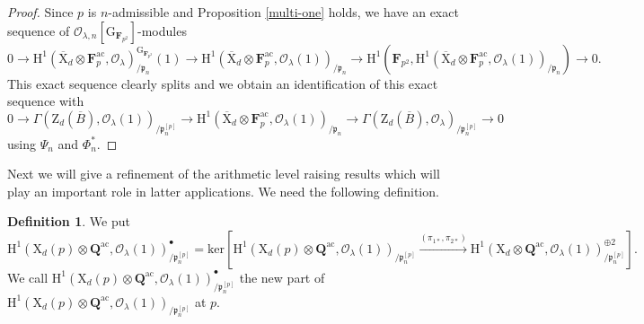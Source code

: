 \documentclass[10pt]{amsart}
\numberwithin{equation}{section}
\theoremstyle{plain}
\numberwithin{equation}{section}
\theoremstyle{definition}
\newtheorem{definition}[theorem]{Definition}
\theoremstyle{remark}
\def\ac{\mathrm{ac}}
\def\Qbar{\QQ^{\ac}}
\def\ac{\mathrm{ac}}
\def\calO{\mathcal{O}}
\def\frakp{\mathfrak{p}}
\def\FF{\mathbf{F}}
\def\QQ{\mathbf{Q}}
\def\rmG{\mathrm{G}}
\def\rmH{\mathrm{H}}
\def\rmX{\mathrm{X}}
\def\rmZ{\mathrm{Z}}
\begin{document}
\begin{proof}
Since $p$ is $n$-admissible and Proposition \ref{multi-one} holds, we have an exact sequence of $\calO_{\lambda, n}[\rmG_{\FF_{p^{2}}}]$-modules
\begin{equation*}
0\rightarrow \rmH^{1}(\overline{\rmX}_{d}\otimes{\FF^{\ac}_{p}}, \calO_{\lambda})_{/\frakp_{n}}^{\rmG_{\FF_{p^{2}}}}(1)\rightarrow \rmH^{1}(\overline{\rmX}_{d}\otimes{\FF^{\ac}_{p}}, \calO_{\lambda}(1))_{/\frakp_{n}}\rightarrow \rmH^{1}(\FF_{p^{2}}, \rmH^{1}(\overline{\rmX}_{d}\otimes{\FF^{\ac}_{p}}, \calO_{\lambda}(1))_{/\frakp_{n}})\rightarrow 0.
\end{equation*}
This exact sequence clearly splits and we obtain an identification of this exact sequence with 
\begin{equation*}
0\rightarrow\Gamma(\rmZ_{d}(\overline{B}), \calO_{\lambda}(1))_{/\frakp^{[p]}_{n}}\rightarrow\rmH^{1}(\overline{\rmX}_{d}\otimes{\FF^{\ac}_{p}}, \calO_{\lambda}(1))_{/\frakp_{n}}\rightarrow \Gamma(\rmZ_{d}(\overline{B}), \calO_{\lambda})_{/\frakp^{[p]}_{n}}\rightarrow0
\end{equation*}
using $\Psi_{n}$ and $\Phi^{\ast}_{n}$. 
\end{proof}

Next we will give a refinement of the arithmetic level raising results which will play an important role in latter applications. We need the following definition.
\begin{definition}
We put
\begin{equation*}
\rmH^{1}(\rmX_{d}(p)\otimes{\Qbar}, \calO_{\lambda}(1))^{\bullet}_{/\frakp^{[p]}_{n}}=\mathrm{ker}[\rmH^{1}(\rmX_{d}(p)\otimes{\Qbar}, \calO_{\lambda}(1))_{/\frakp^{[p]}_{n}}\xrightarrow{(\pi_{1\ast}, \pi_{2\ast})}\rmH^{1}(\rmX_{d}\otimes{\Qbar}, \calO_{\lambda}(1))_{/\frakp^{[p]}_{n}}^{\oplus2}].
\end{equation*}
We call  $\rmH^{1}(\rmX_{d}(p)\otimes{\Qbar}, \calO_{\lambda}(1))^{\bullet}_{/\frakp^{[p]}_{n}}$ the {new part} of $\rmH^{1}(\rmX_{d}(p)\otimes{\Qbar}, \calO_{\lambda}(1))_{/\frakp^{[p]}_{n}}$ at $p$.
\end{definition}
\end{document}
